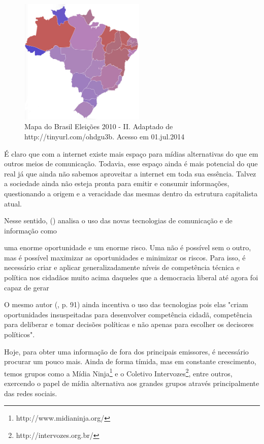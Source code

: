 \documentclass[
	article,			%
	12pt,				%
	oneside,			%
	a4paper,			%
	english,			%
	brazil,				%
	]{abntex2}
\begin{document}
\begin{figure}[ht!]
\centering
\includegraphics[width=60mm,height=60mm]{mapa_2.png}
\caption{Mapa do Brasil Eleições 2010 - II. Adaptado de http://tinyurl.com/ohdgu3b. Acesso em 01.jul.2014}
\label{overflow}
\end{figure}

É claro que com a internet existe mais espaço para mídias alternativas do que em outros meios de comunicação. Todavia, esse espaço ainda é mais potencial do que real já que ainda não sabemos aproveitar a internet em toda sua essência. Talvez a sociedade ainda não esteja pronta para emitir e consumir informações, questionando a origem e a veracidade das mesmas dentro da estrutura capitalista atual. 

Nesse sentido,  (\citeyear{boaventura2005}) analisa o uso das novas tecnologias de comunicação e de informação como 

\begin{citacao}
uma enorme oportunidade e um enorme risco. Uma não é possível sem o outro, mas é possível maximizar as oportunidades e minimizar os riscos. Para isso, é necessário criar e aplicar generalizadamente níveis de competência técnica e política nos cidadãos muito acima daqueles que a democracia liberal até agora foi capaz de gerar \cite[p.90]{boaventura2005}
\end{citacao}

O mesmo autor (\citeyear{boaventura2005}, p. 91) ainda incentiva o uso das tecnologias pois elas "criam oportunidades insuspeitadas para desenvolver competência cidadã, competência para deliberar e tomar decisões políticas e não apenas para escolher os decisores políticos".

Hoje, para obter uma informação de fora dos principais emissores, é necessário procurar um pouco mais. Ainda de forma tímida, mas em constante crescimento, temos grupos como a Mídia Ninja\footnote{http://www.midianinja.org/} e o Coletivo Intervozes\footnote{http://intervozes.org.br/}, entre outros, exercendo o papel de mídia alternativa aos grandes grupos através principalmente das redes sociais. 
\end{document}
